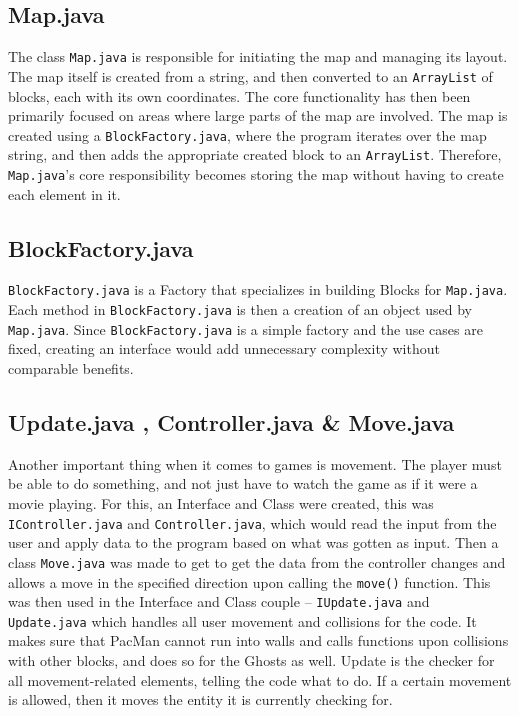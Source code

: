 \documentclass[a4paper,5pt]{article}
\begin{document}
\subsection{Map.java}
The class \texttt{Map.java} is responsible for initiating the map and managing its layout. The map itself is created from a string, and then converted to an \texttt{ArrayList} of blocks, each with its own coordinates. The core functionality has then been primarily focused on areas where large parts of the map are involved. The map is created using a \texttt{BlockFactory.java}, where the program iterates over the map string, and then adds the appropriate created block to an \texttt{ArrayList}. Therefore, \texttt{Map.java}'s core responsibility becomes storing the map without having to create each element in it.
\subsection{BlockFactory.java}
\texttt{BlockFactory.java} is a Factory that specializes in building Blocks for \texttt{Map.java}. Each method in \texttt{BlockFactory.java} is then a creation of an object used by \texttt{Map.java}. Since \texttt{BlockFactory.java} is a simple factory and the use cases are fixed, creating an interface would add unnecessary complexity without comparable benefits.

\subsection{Update.java , Controller.java \& Move.java}
Another important thing when it comes to games is movement. The player must be able to do something, and not just have to watch the game as if it were a movie playing. For this, an Interface and Class were created, this was \texttt{IController.java} and \texttt{Controller.java}, which would read the input from the user and apply data to the program based on what was gotten as input. Then a class \texttt{Move.java} was made to get to get the data from the controller changes and allows a move in the specified direction upon calling the \texttt{move()} function. This was then used in the Interface and Class couple – \texttt{IUpdate.java} and \texttt{Update.java} which handles all user movement and collisions for the code. It makes sure that PacMan cannot run into walls and calls functions upon collisions with other blocks, and does so for the Ghosts as well. Update is the checker for all movement-related elements, telling the code what to do. If a certain movement is allowed, then it moves the entity it is currently checking for. 
\end{document}
